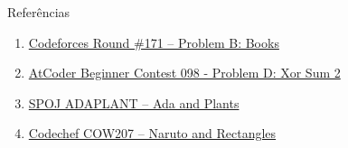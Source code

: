 \begin{frame}[fragile]{Referências}

    \begin{enumerate}
        \item \href{https://codeforces.com/problemset/problem/279/B}{Codeforces Round \#171 --
            Problem B: Books} 

        \item \href{https://atcoder.jp/contests/abc098/tasks/arc098_b}{AtCoder Beginner Contest
            098 - Problem D: Xor Sum 2}
 
        \item \href{https://www.spoj.com/problems/ADAPLANT/}{SPOJ ADAPLANT -- Ada and Plants}

        \item \href{https://www.codechef.com/problems/COW207}{Codechef COW207 -- Naruto and
            Rectangles} 

    \end{enumerate}

\end{frame}
